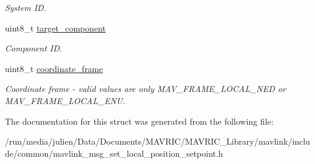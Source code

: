 \begin{DoxyCompactItemize}
\begin{DoxyCompactList}\small\item\em System I\+D. \end{DoxyCompactList}\item 
\hypertarget{struct____mavlink__set__local__position__setpoint__t_a21b41f125902f6e9695005b9df4c1430}{uint8\+\_\+t \hyperlink{struct____mavlink__set__local__position__setpoint__t_a21b41f125902f6e9695005b9df4c1430}{target\+\_\+component}}\label{struct____mavlink__set__local__position__setpoint__t_a21b41f125902f6e9695005b9df4c1430}

\begin{DoxyCompactList}\small\item\em Component I\+D. \end{DoxyCompactList}\item 
\hypertarget{struct____mavlink__set__local__position__setpoint__t_af715de6975547e7e06421ea07b855898}{uint8\+\_\+t \hyperlink{struct____mavlink__set__local__position__setpoint__t_af715de6975547e7e06421ea07b855898}{coordinate\+\_\+frame}}\label{struct____mavlink__set__local__position__setpoint__t_af715de6975547e7e06421ea07b855898}

\begin{DoxyCompactList}\small\item\em Coordinate frame -\/ valid values are only M\+A\+V\+\_\+\+F\+R\+A\+M\+E\+\_\+\+L\+O\+C\+A\+L\+\_\+\+N\+E\+D or M\+A\+V\+\_\+\+F\+R\+A\+M\+E\+\_\+\+L\+O\+C\+A\+L\+\_\+\+E\+N\+U. \end{DoxyCompactList}\end{DoxyCompactItemize}


The documentation for this struct was generated from the following file\+:\begin{DoxyCompactItemize}
\item 
/run/media/julien/\+Data/\+Documents/\+M\+A\+V\+R\+I\+C/\+M\+A\+V\+R\+I\+C\+\_\+\+Library/mavlink/include/common/mavlink\+\_\+msg\+\_\+set\+\_\+local\+\_\+position\+\_\+setpoint.\+h\end{DoxyCompactItemize}
